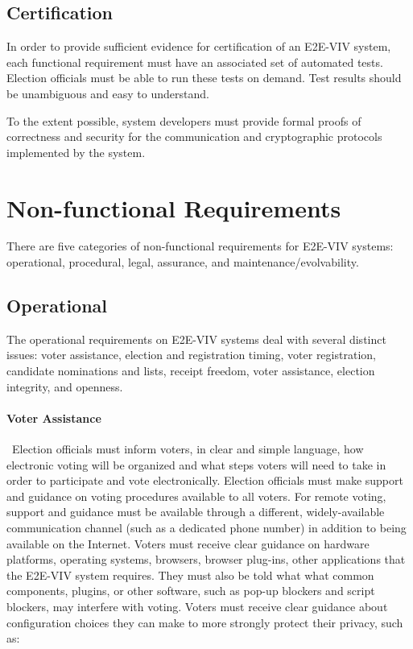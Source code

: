 \subsection{Certification}

In order to provide sufficient evidence for certification of an
E2E-VIV system, each functional requirement must have an associated
set of automated tests. Election officials must be able to run these
tests on demand. Test results should be unambiguous and easy to
understand.

To the extent possible, system developers must provide formal proofs
of correctness and security for the communication and cryptographic
protocols implemented by the system.

\section{Non-functional Requirements}

There are five categories of non-functional requirements for E2E-VIV
systems: operational, procedural, legal, assurance, and
maintenance/evolvability.

\subsection{Operational}
\label{req:operational}

The operational requirements on E2E-VIV systems deal with several
distinct issues: voter assistance, election and registration timing,
voter registration, candidate nominations and lists, receipt freedom,
voter assistance, election integrity, and openness.

\paragraph{Voter Assistance} \ Election officials must inform voters,
in clear and simple language, how electronic voting will be organized
and what steps voters will need to take in order to participate and
vote electronically. Election officials must make support and guidance
on voting procedures available to all voters. For remote voting,
support and guidance must be available through a different,
widely-available communication channel (such as a dedicated phone
number) in addition to being available on the Internet. Voters must
receive clear guidance on hardware platforms, operating systems,
browsers, browser plug-ins, other applications that the E2E-VIV system
requires. They must also be told what what common components, plugins,
or other software, such as pop-up blockers and script blockers, may
interfere with voting. Voters must receive clear guidance about
configuration choices they can make to more strongly protect their
privacy, such as:

